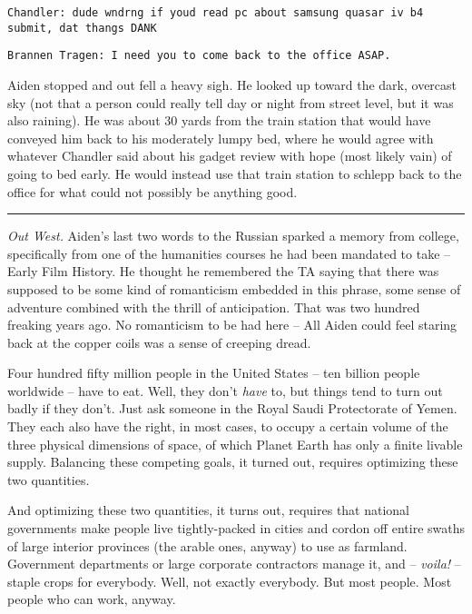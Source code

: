 \documentclass[11pt]{book}
\begin{document}
	\vspace{0.5cm}
	
	\texttt{Chandler: dude wndrng if youd read pc about samsung quasar iv b4 submit, dat thangs DANK} 
	
	\texttt{Brannen Tragen: I need you to come back to the office ASAP.}
	
	\vspace{0.5cm}
	
	Aiden stopped and out fell a heavy sigh. He looked up toward the dark, overcast sky (not that a person could really tell day or night from street level, but it was also raining). He was about 30 yards from the train station that would have conveyed him back to his moderately lumpy bed, where he would agree with whatever Chandler said about his gadget review with hope (most likely vain) of going to bed early. He would instead use that train station to schlepp back to the office for what could not possibly be anything good.
	
	\vspace{0.5cm}
	\hrule
	\vspace{0.5cm}
	
	\textit{Out West.} Aiden's last two words to the Russian sparked a memory from college, specifically from one of the humanities courses he had been mandated to take -- Early Film History. He thought he remembered the TA saying that there was supposed to be some kind of romanticism embedded in this phrase, some sense of adventure combined with the thrill of anticipation. That was two hundred freaking years ago. No romanticism to be had here -- All Aiden could feel staring back at the copper coils was a sense of creeping dread.
	
	Four hundred fifty million people in the United States -- ten billion people worldwide -- have to eat. Well, they don't \textit{have} to, but things tend to turn out badly if they don't. Just ask someone in the Royal Saudi Protectorate of Yemen. They each also have the right, in most cases, to occupy a certain volume of the three physical dimensions of space, of which Planet Earth has only a finite livable supply. Balancing these competing goals, it turned out, requires optimizing these two quantities.
	
	And optimizing these two quantities, it turns out, requires that national governments make people live tightly-packed in cities and cordon off entire swaths of large interior provinces (the arable ones, anyway) to use as farmland. Government departments or large corporate contractors manage it, and -- \textit{voila!} -- staple crops for everybody. Well, not exactly everybody. But most people. Most people who can work, anyway.
	
\end{document}
